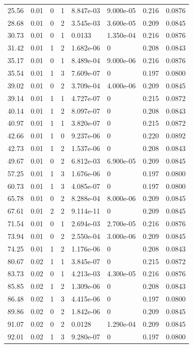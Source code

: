 \documentclass[preview]{standalone}
\begin{document}
{{\begin{tabular}{L{1.2cm}C{1.2cm} C{0.3cm}C{0.5cm} C{1.4cm}C{1.4cm} C{1.4cm}C{1.4cm}}
  25.56  &  0.01  & 0     &  1 &  8.847e-03  & 9.000e-05  & 0.216 &  0.0876   \\ 
  28.68  &  0.01  & 0     &  2 &  3.545e-03  & 3.600e-05  & 0.209 &  0.0845   \\ 
  30.73  &  0.01  & 0     &  1 &  0.0133  & 1.350e-04  & 0.216 &  0.0876   \\ 
  31.42  &  0.01  & 1     &  2 &  1.682e-06  & 0  & 0.208 &  0.0843   \\ 
  35.17  &  0.01  & 0     &  1 &  8.489e-04  & 9.000e-06  & 0.216 &  0.0876   \\ 
  35.54  &  0.01  & 1     &  3 &  7.609e-07  & 0  & 0.197 &  0.0800   \\ 
  39.02  &  0.01  & 0     &  2 &  3.709e-04  & 4.000e-06  & 0.209 &  0.0845   \\ 
  39.14  &  0.01  & 1     &  1 &  4.727e-07  & 0  & 0.215 &  0.0872   \\ 
  40.14  &  0.01  & 1     &  2 &  8.097e-07  & 0  & 0.208 &  0.0843   \\ 
  40.97  &  0.01  & 1     &  1 &  3.820e-07  & 0  & 0.215 &  0.0872   \\ 
  42.66  &  0.01  & 1     &  0 &  9.237e-06  & 0  & 0.220 &  0.0892   \\ 
  42.73  &  0.01  & 1     &  2 &  1.537e-06  & 0  & 0.208 &  0.0843   \\ 
  49.67  &  0.01  & 0     &  2 &  6.812e-03  & 6.900e-05  & 0.209 &  0.0845   \\ 
  57.25  &  0.01  & 1     &  3 &  1.676e-06  & 0  & 0.197 &  0.0800   \\ 
  60.73  &  0.01  & 1     &  3 &  4.085e-07  & 0  & 0.197 &  0.0800   \\ 
  65.78  &  0.01  & 0     &  2 &  8.288e-04  & 8.000e-06  & 0.209 &  0.0845   \\ 
  67.61  &  0.01  & 2     &  2 &  9.114e-11  & 0  & 0.209 &  0.0845   \\ 
  71.54  &  0.01  & 0     &  1 &  2.694e-03  & 2.700e-05  & 0.216 &  0.0876   \\ 
  73.94  &  0.01  & 0     &  2 &  2.550e-04  & 3.000e-06  & 0.209 &  0.0845   \\ 
  74.25  &  0.01  & 1     &  2 &  1.176e-06  & 0  & 0.208 &  0.0843   \\ 
  80.67  &  0.02  & 1     &  1 &  3.845e-07  & 0  & 0.215 &  0.0872   \\ 
  83.73  &  0.02  & 0     &  1 &  4.213e-03  & 4.300e-05  & 0.216 &  0.0876   \\ 
  85.85  &  0.02  & 1     &  2 &  1.309e-06  & 0  & 0.208 &  0.0843   \\ 
  86.48  &  0.02  & 1     &  3 &  4.415e-06  & 0  & 0.197 &  0.0800   \\ 
  89.86  &  0.02  & 0     &  2 &  1.842e-06  & 0  & 0.209 &  0.0845   \\ 
  91.07  &  0.02  & 0     &  2 &  0.0128  & 1.290e-04  & 0.209 &  0.0845   \\ 
  92.01  &  0.02  & 1     &  3 &  9.280e-07  & 0  & 0.197 &  0.0800   \\ 
\hline 
\end{tabular} 

}}
\end{document}
